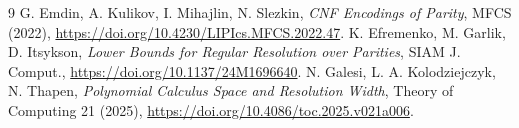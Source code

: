 \documentclass[11pt]{article}
\begin{document}
\begin{thebibliography}{9}
 G. Emdin, A. Kulikov, I. Mihajlin, N. Slezkin, \emph{CNF Encodings of Parity}, MFCS (2022), \url{https://doi.org/10.4230/LIPIcs.MFCS.2022.47}.
 K. Efremenko, M. Garlik, D. Itsykson, \emph{Lower Bounds for Regular Resolution over Parities}, SIAM J. Comput., \url{https://doi.org/10.1137/24M1696640}.
 N. Galesi, L. A. Kolodziejczyk, N. Thapen, \emph{Polynomial Calculus Space and Resolution Width}, Theory of Computing 21 (2025), \url{https://doi.org/10.4086/toc.2025.v021a006}.
\end{thebibliography}
\end{document}
